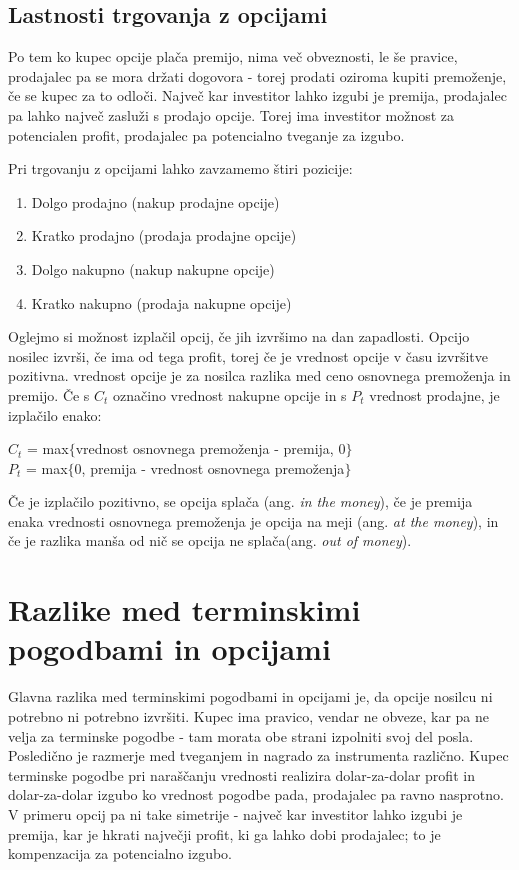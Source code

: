 \documentclass[a4paper]{article}
\begin{document}
\subsection{Lastnosti trgovanja z opcijami}
Po tem ko kupec opcije plača premijo, nima več obveznosti, le še pravice, prodajalec pa se mora držati dogovora - torej prodati
oziroma kupiti premoženje, če se kupec za to odloči. Največ kar investitor lahko izgubi je premija,
prodajalec pa lahko največ zasluži s prodajo opcije. Torej ima investitor možnost za potencialen profit,
prodajalec pa potencialno tveganje za izgubo. \par
Pri trgovanju z opcijami lahko zavzamemo štiri pozicije:
\begin{enumerate}
    \item Dolgo prodajno (nakup prodajne opcije)
    \item Kratko prodajno (prodaja prodajne opcije)
    \item Dolgo nakupno (nakup nakupne opcije)
    \item Kratko nakupno (prodaja nakupne opcije)
\end{enumerate}
\pagebreak
Oglejmo si možnost izplačil opcij, če jih izvršimo na dan zapadlosti. Opcijo nosilec izvrši, če ima od tega profit, torej
če je vrednost opcije v času izvršitve pozitivna. vrednost opcije je za nosilca razlika med ceno osnovnega premoženja in premijo.
Če s $C_{t}$ označino vrednost nakupne opcije in s $P_{t}$ vrednost prodajne, je izplačilo enako:
\begin{center}
$C_{t}$ = max$\{$vrednost osnovnega premoženja - premija, 0$\}$ \\
$P_{t}$ = max$\{$0, premija - vrednost osnovnega premoženja$\}$
\end{center}
Če je izplačilo pozitivno, se opcija splača (ang. \textit{in the money}), če je premija enaka vrednosti osnovnega premoženja
je opcija na meji (ang. \textit{at the money}), in če je razlika manša od nič se opcija ne splača(ang. \textit{out of money}).

\section{Razlike med terminskimi pogodbami in opcijami}
Glavna razlika med terminskimi pogodbami in opcijami je, da opcije nosilcu ni potrebno ni potrebno izvršiti. Kupec ima pravico,
vendar ne obveze, kar pa ne velja za terminske pogodbe - tam morata obe strani izpolniti svoj del posla.
Posledično je razmerje med tveganjem in nagrado za instrumenta različno. Kupec terminske pogodbe pri naraščanju vrednosti
realizira dolar-za-dolar profit in dolar-za-dolar izgubo ko vrednost pogodbe pada, prodajalec pa ravno nasprotno. V primeru
opcij pa ni take simetrije - največ kar investitor lahko izgubi je premija, kar je hkrati največji profit, ki ga lahko dobi prodajalec;
to je kompenzacija za potencialno izgubo.
\end{document}

